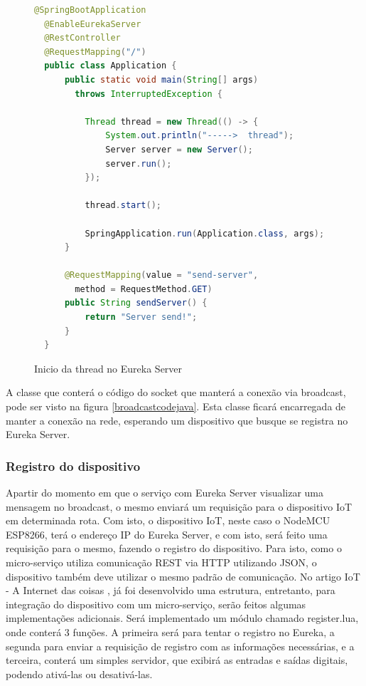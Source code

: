 \documentclass[journal]{IEEEtran}
\begin{document}
\begin{figure}[H]
\centering

\begin{lstlisting}[language=Java]
  @SpringBootApplication
  @EnableEurekaServer
  @RestController
  @RequestMapping("/")
  public class Application {
      public static void main(String[] args) 
        throws InterruptedException {

          Thread thread = new Thread(() -> {
              System.out.println("----->  thread");
              Server server = new Server();
              server.run();
          });

          thread.start();

          SpringApplication.run(Application.class, args);
      }

      @RequestMapping(value = "send-server", 
        method = RequestMethod.GET)
      public String sendServer() {
          return "Server send!";
      }
  }
\end{lstlisting}
\caption{Inicio da thread no Eureka Server}
\label{broadcasteureka}
\end{figure}

A classe que conterá o código do socket que manterá a conexão via broadcast, pode ser visto na figura \ref{broadcastcodejava}. Esta classe ficará encarregada de manter a conexão na rede, esperando um dispositivo que busque se registra no Eureka Server.

\subsubsection{Registro do dispositivo}

Apartir do momento em que o serviço com Eureka Server visualizar uma mensagem no broadcast, o mesmo enviará um requisição para o dispositivo IoT em determinada rota. Com isto, o dispositivo IoT, neste caso o NodeMCU ESP8266, terá o endereço IP do Eureka Server, e com isto, será feito uma requisição para o mesmo, fazendo o registro do dispositivo. Para isto, como o micro-serviço utiliza comunicação REST via HTTP utilizando JSON, o dispositivo também deve utilizar o mesmo padrão de comunicação. No artigo IoT - A Internet das coisas \cite{freiregebaraiot}, já foi desenvolvido uma estrutura, entretanto, para integração do dispositivo com um micro-serviço, serão feitos algumas implementações adicionais. Será implementado um módulo chamado register.lua, onde conterá 3 funções. A primeira será para tentar o registro no Eureka, a segunda para enviar a requisição de registro com as informações necessárias, e a terceira, conterá um simples servidor, que exibirá as entradas e saídas digitais, podendo ativá-las ou desativá-las. 
\end{document}
